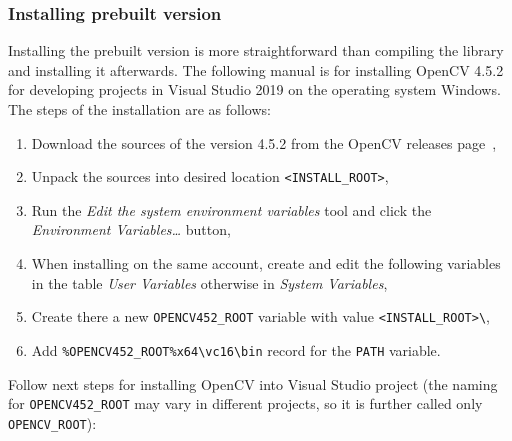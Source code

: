 \documentclass[thesis=B,english]{FITthesis}[2019/12/23]
\begin{document}
            \subsubsection*{Installing prebuilt version}
                Installing the prebuilt version is more straightforward than compiling the library and installing it afterwards. The following manual is for installing OpenCV 4.5.2 for developing projects in Visual Studio 2019 on the operating system Windows. The steps of the installation are as follows:
                \begin{enumerate}
                    \item Download the sources of the version 4.5.2 from the OpenCV releases page~\cite{OpenCVReleases},
                    \item Unpack the sources into desired location \texttt{<INSTALL\_ROOT>},
                    \item Run the \textit{Edit the system environment variables} tool and click the \textit{Environment Variables\dots} button,
                    \item When installing on the same account, create and edit the following variables in the table \textit{User Variables} otherwise in \textit{System Variables},
                    \item Create there a new \texttt{OPENCV452\_ROOT} variable with value \texttt{<INSTALL\_ROOT>\textbackslash},
                    \item Add \texttt{\%OPENCV452\_ROOT\%x64\textbackslash vc16\textbackslash bin} record for the \texttt{PATH} variable.
                \end{enumerate}
                Follow next steps for installing OpenCV into Visual Studio project (the naming for \texttt{OPENCV452\_ROOT} may vary in different projects, so it is further called only \texttt{OPENCV\_ROOT}):
\end{document}

